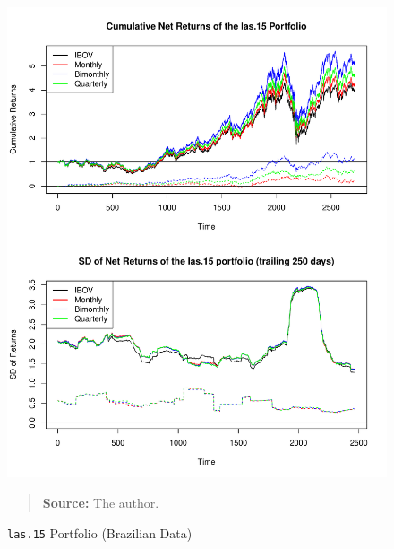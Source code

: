 \documentclass[preprint, doubleblind, authoryear,10pt]{elsarticle}
\begin{document}
\begin{figure}[htpb]
\centering
\footnotesize
\caption{\texttt{las.15} Portfolio (Brazilian Data)}
\label{fig:ibov:las.15}
\includegraphics[width=.95\linewidth]{./figs/IBOV-retac-las-15.pdf}
\begin{quote}
\textbf{Source:} The author.
\end{quote}
\end{figure}
\end{document}
